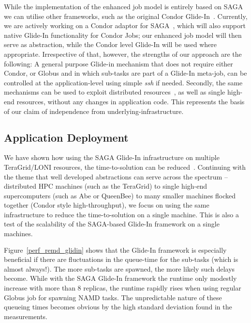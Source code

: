 \documentclass{llncs}
\begin{document}
While the implementation of the enhanced job model is entirely based
on SAGA %
we can utilise other frameworks, such as the original Condor
Glide-In~\cite{citeulike:291860}. %
Currently, we are actively working on a Condor adaptor for
SAGA~\cite{saga_condor_url}, which will also support native Glide-In
functionality for Condor Jobs; our enhanced job model will then serve
as abstraction, while the Condor level Glide-In will be used where
appropriate.  Irrespective of that, however, the strengths of our
approach are the following: A general purpose Glide-in mechanism that
does not require either Condor, or Globus and in which sub-tasks are
part of a Glide-In meta-job, can be controlled at the
application-level using simple {\it ssh} if needed. Secondly, the same
mechanisms can be used to exploit distributed
resources~\cite{repex_ptrsa}, as well as single high-end resources,
without any changes in application code.  This represents the basis of
our claim of independence from underlying-infrastructure.

\up

\subsection{Application Deployment}

\up


We have shown how using the SAGA Glide-In infrastructure on multiple
TeraGrid/LONI resources, the time-to-solution can be
reduced~\cite{Luckow:2008la}. Continuing with the theme that well
developed abstractions can serve across the spectrum -- distributed
HPC machines (such as the TeraGrid) to single high-end supercomputers
(such as Abe or QueenBee) to many smaller machines flocked together
(Condor style high-throughput), we focus on using the same
infrastructure to reduce the time-to-solution on a single machine.
This is also a test of the scalability of the SAGA-based Glide-In
framework on a single machines. %

Figure~\ref{perf_remd_glidin} shows that the Glide-In framework is
especially beneficial if there are fluctuations in the queue-time for
the sub-tasks (which is almost always!). The more sub-tasks are
spawned, the more likely such delays become. While with
the SAGA Glide-In framework the runtime only modestly increase with
more than 8 replicas, the runtime rapidly rises when using regular
Globus job for spawning NAMD tasks. The unpredictable nature of these
queueing times becomes obvious by the high standard deviation found in
the measurements.
\end{document}
